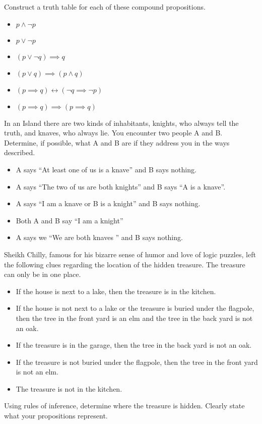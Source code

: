 \documentclass[addpoints]{exam}
\newenvironment{problem}[2][Problem]{\begin{trivlist}
    \item[\hskip \labelsep {\bfseries #1}\hskip \labelsep {\bfseries #2.}]}{\end{trivlist}}
\begin{document}
\begin{problem}{3}
Construct a truth table for each of these compound propositions.
\begin{itemize}
    \item[(a)] $ p \land \neg p$
    \item[(b)] $ p \lor \neg p$
    \item[(c)] $ (p \lor \neg q) \implies  q$
    \item[(d)] $ (p \lor q) \implies (p \land q) $
    \item[(e)] $ (p \implies q) \leftrightarrow (\neg q \implies \neg p) $
    \item[(f)] $ (p \implies q) \implies (p \implies q) $
\end{itemize}

\end{problem}

\begin{problem}{4}
In an Island there are two kinds of inhabitants, knights, who always tell the truth, and knaves, who always lie. You encounter two people
A and B. Determine, if possible, what A and B are if they address you in the ways described.
\begin{itemize}
    \item[(a)] A says ``At least one of us is a knave'' and B says nothing.
    \item[(b)] A says ``The two of us are both knights'' and B says ``A is a knave''. 
    \item[(c)] A says ``I am a knave or B is a knight'' and B says nothing.
    \item[(d)] Both A and B say ``I am a knight''
    \item[(e)] A says we ``We are both knaves '' and B says nothing. 
\end{itemize}
\end{problem}

\begin{problem}{5}
    Sheikh Chilly, famous for his bizarre sense of humor and love of logic puzzles, left the following clues
regarding the location of the hidden treasure. The treasure can only be in one place.
\begin{itemize}
    \item If the house is next to a lake, then the treasure is in the kitchen.
    \item If the house is not next to a lake or the treasure is buried under the flagpole, then the tree in the front yard is an elm and the tree in the back yard is not an oak.
    \item If the treasure is in the garage, then the tree in the back yard is not an oak.
    \item If the treasure is not buried under the flagpole, then the tree in the front yard is not an elm.
    \item The treasure is not in the kitchen.
\end{itemize}
Using rules of inference, determine where the treasure is hidden. Clearly state what your propositions
represent.
\end{problem}

\begin{questions}
    \question
    \begin{solution}
        
    \end{solution}

\end{questions}
\end{document}

